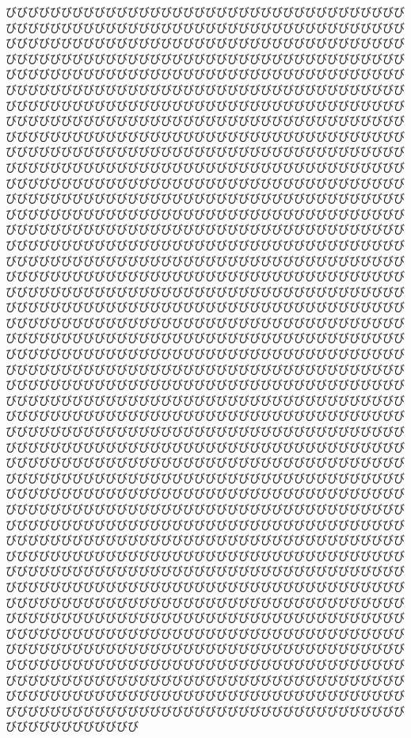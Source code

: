 \documentclass[a4paper, 9pt]{article}
\begin{document}
びびびびびびびびびびびびびびびびびびびびびびびびびびびびびびびびびびびびびびびびびびびびびびびびびびびびびびびびびびびびびびびびびびびびびびびびびびびびびびびびびびびびびびびびびびびびびびびびびびびびびびびびびびびびびびびびびびびびびびびびびびびびびびびびびびびびびびびびびびびびびびびびびびびびびびびびびびびびびびびびびびびびびびびびびびびびびびびびびびびびびびびびびびびびびびびびびびびびびびびびびびびびびびびびびびびびびびびびびびびびびびびびびびびびびびびびびびびびびびびびびびびびびびびびびびびびびびびびびびびびびびびびびびびびびびびびびびびびびびびびびびびびびびびびびびびびびびびびびびびびびびびびびびびびびびびびびびびびびびびびびびびびびびびびびびびびびびびびびびびびびびびびびびびびびびびびびびびびびびびびびびびびびびびびびびびびびびびびびびびびびびびびびびびびびびびびびびびびびびびびびびびびびびびびびびびびびびびびびびびびびびびびびびびびびびびびびびびびびびびびびびびびびびびびびびびびびびびびびびびびびびびびびびびびびびびびびびびびびびびびびびびびびびびびびびびびびびびびびびびびびびびびびびびびびびびびびびびびびびびびびびびびびびびびびびびびびびびびびびびびびびびびびびびびびびびびびびびびびびびびびびびびびびびびびびびびびびびびびびびびびびびびびびびびびびびびびびびびびびびびびびびびびびびびびびびびびびびびびびびびびびびびびびびびびびびびびびびびびびびびびびびびびびびびびびびびびびびびびびびびびびびびびびびびびびびびびびびびびびびびびびびびびびびびびびびびびびびびびびびびびびびびびびびびびびびびびびびびびびびびびびびびびびびびびびびびびびびびびびびびびびびびびびびびびびびびびびびびびびびびびびびびびびびびびびびびびびびびびびびびびびびびびびびびびびびびびびびびびびびびびびびびびびびびびびびびびびびびびびびびびびびびびびびびびびびびびびびびびびびびびびびびびびびびびびびびびびびびびびびびびびびびびびびびびびびびびびびびびびびびびびびびびびびびびびびびびびびびびびびびびびびびびびびびびびびびびびびびびびびびびびびびびびびびびびびびびびびびびびびびびびびびびびびびびびびびびびびびびびびびびびびびびびびびびびびびびびびびびびびびびびびびびびびびびびびびびびびびびびびびびびびびびびびびびびびびびびびびびびびびびびびびびびびびびびびびびびびびびびびびびびびびびびびびびびびびびびびびびびびびびびびびびびびびびびびびびびびびびびびびびびびびびびびびびびびびびびびびびびびびびびびびびびびびびびびびびびびびびびびびびびびびびびびびびびびびびびびびびびびびびびびびびびびびびびびびびびびびびびびびびびびびびびびびびびびびびびびびびびびびびびびびびびびびびびびびびびびびびびびびびびびびびびびびびびびびびびびびびびびびびびびびびびびびびびびびびびびびびびびびびびびびびびびびびびびびびびびびびびびびびびびびびびびびびびびびびびびびびびびびびびびびびびびびびびびびびびびびびびびびびびびびびびびびびびびびびびびびびびびびびびびびびびびびびびびびびびびびびびびびびびびびびびびびびびびびびびびびびびびびびびびびびびびびびびびびびびびびびびびびびびびびびびびびびびびびびびびびびびびびびびびびびびびびびびびびびびびびびびびびびびびびびびびびびびびびびびびびびびびびびびびびびびびびびびびびびびびびびびびびびびびびびびびびびびびびびびびびびびびびびびびびびびびびびびびびびびびびびびびびびびびびびびびびびびびびびびびびびびびびびびびびびびびびびびびびびびびびびびびびびびびびびびびびびびびびびびびびびびびびびびびびびびびびびびびびびびびびびびびびびびびびびびびびびびびびびびびびびびびびびびびびびびびびびびびびびびびびびびびびびびびびびびびびびびびびびびびびびびびびびびびびびびびびびびびびびびびびびびびびびびびびびびびび
\end{document}
